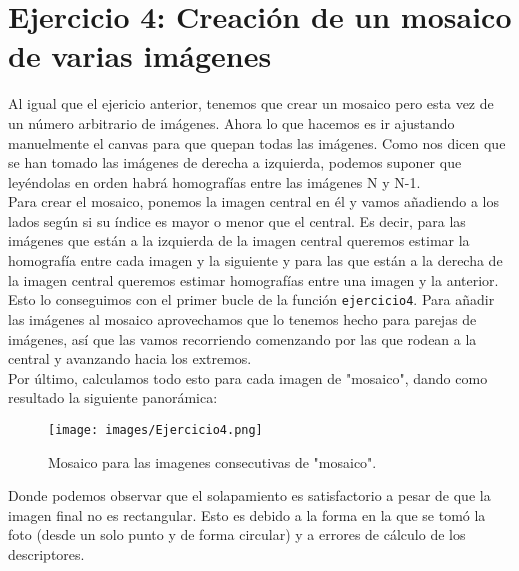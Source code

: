 \documentclass[12pt]{article}
\begin{document}
\section*{Ejercicio 4: Creación de un mosaico de varias imágenes}
Al igual que el ejericio anterior, tenemos que crear un mosaico pero esta vez de un número arbitrario de imágenes. Ahora lo que hacemos es ir ajustando manuelmente el canvas para que quepan todas las imágenes. Como nos dicen que se han tomado las imágenes de derecha a izquierda, podemos suponer que leyéndolas en orden habrá homografías entre las imágenes N y N-1.\\
Para crear el mosaico, ponemos la imagen central en él y vamos añadiendo a los lados según si su índice es mayor o menor que el central. Es decir, para las imágenes que están a la izquierda de la imagen central queremos estimar la homografía entre cada imagen y la siguiente y para las que están a la derecha de la imagen central queremos estimar homografías entre una imagen y la anterior. Esto lo conseguimos con el primer bucle de la función \texttt{ejercicio4}. Para añadir las imágenes al mosaico aprovechamos que lo tenemos hecho para parejas de imágenes, así que las vamos recorriendo comenzando por las que rodean a la central y avanzando hacia los extremos.\\
Por último, calculamos todo esto para cada imagen de "mosaico", dando como resultado la siguiente panorámica:\\
\begin{figure}[H]
\centering
\texttt{[image: images/Ejercicio4.png]} 
\caption{Mosaico para las imagenes consecutivas de "mosaico".}
\label{etiqueta}
\end{figure}
Donde podemos observar que el solapamiento es satisfactorio a pesar de que la imagen final no es rectangular. Esto es debido a la forma en la que se tomó la foto (desde un solo punto y de forma circular) y a errores de cálculo de los descriptores.


 
\end{document}
